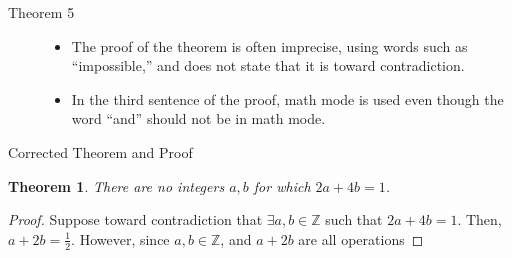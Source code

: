 \documentclass[10pt]{extarticle}
\newtheorem{theorem}{Theorem}
\newcommand{\Z}{\mathbb{Z}}
\begin{document}
  \begin{description}
    \item[Theorem 5]\hfill
      \begin{itemize}
        \item The proof of the theorem is often imprecise, using words such as ``impossible,'' and does not state that it is toward contradiction.
        \item In the third sentence of the proof, math mode is used even though the word ``and'' should not be in math mode.
      \end{itemize}
  \end{description}
  \begin{problem}{Corrected Theorem and Proof}
    \begin{theorem}
      There are no integers $a,b$ for which $2a + 4b = 1$.
    \end{theorem}
    \begin{proof}
      Suppose toward contradiction that $\exists a,b\in \Z$ such that $2a + 4b = 1$. Then, $a + 2b = \frac{1}{2}$. However, since $a,b\in\Z$, and $a + 2b$ are all operations 
    \end{proof}
  \end{problem}
\end{document}
